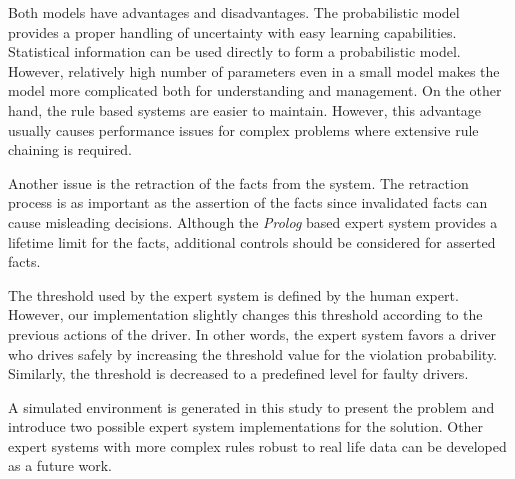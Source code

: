 \documentclass[letterpaper, 10 pt, conference]{ieeeconf}
\begin{document}
Both models have advantages and disadvantages. The probabilistic model provides a proper handling of uncertainty with easy learning capabilities. Statistical information can be used directly to form a probabilistic model. However, relatively high number of parameters even in a small model makes the model more complicated both for understanding and management. On the other hand, the rule based systems are easier to maintain. However, this advantage usually causes performance issues for complex problems where extensive rule chaining is required.

Another issue is the retraction of the facts from the system. The retraction process is as important as the assertion of the facts since invalidated facts can cause misleading decisions. Although the \textit{Prolog} based expert system provides a lifetime limit for the facts, additional controls should be considered for asserted facts.

The threshold used by the expert system is defined by the human expert. However, our implementation slightly changes this threshold according to the previous actions of the driver. In other words, the expert system favors a driver who drives safely by increasing the threshold value for the violation probability. Similarly, the threshold is decreased to a predefined level for faulty drivers.

A simulated environment is generated in this study to present the problem and introduce two possible expert system implementations for the solution. Other expert systems with more complex rules robust to real life data can be developed as a future work.


	
\end{document}
